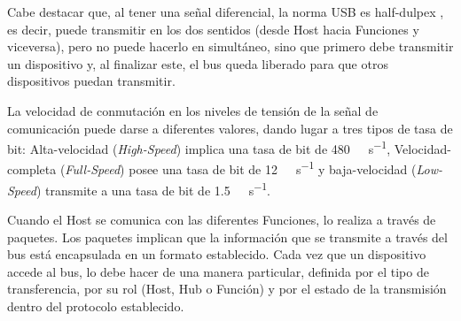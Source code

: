 Cabe destacar que, al tener una señal diferencial, la norma USB es {half-dulpex \it}, es decir, puede transmitir en los dos sentidos (desde Host hacia Funciones y viceversa), pero no puede hacerlo en simultáneo\cite{Riihonen2015}, sino que primero debe transmitir un dispositivo y, al finalizar este, el bus queda liberado para que otros dispositivos puedan transmitir.%

La velocidad de conmutación en los niveles de tensión de la señal de comunicación puede darse a diferentes valores, dando lugar a tres tipos de tasa de bit: Alta-velocidad ({\it High-Speed}) implica una tasa de bit de \SI{480}{\mega\bit\per\second}, Velocidad-completa ({\it Full-Speed}) posee una tasa de bit de \SI{12}{\mega\bit\per\second} y baja-velocidad ({\it Low-Speed}) transmite a una tasa de bit de \SI{1.5}{\mega\bit\per\second}.%

Cuando el Host se comunica con las diferentes Funciones, lo realiza a través de paquetes. Los paquetes implican que la información que se transmite a través del bus está encapsulada en un formato establecido. Cada vez que un dispositivo accede al bus, lo debe hacer de una manera particular, definida por el tipo de transferencia, por su rol (Host, Hub o Función) y por el estado de la transmisión dentro del protocolo establecido.